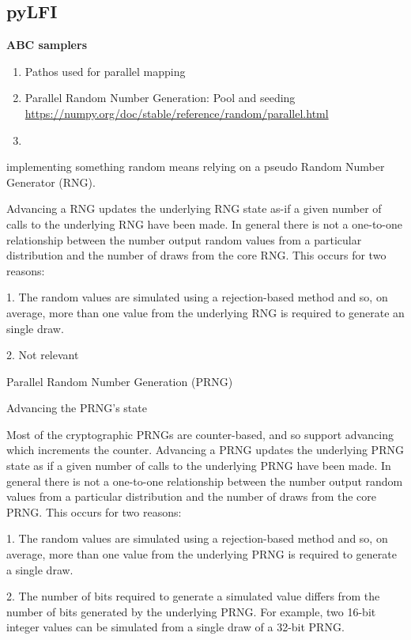 \subsection{pyLFI}

\textbf{ABC samplers} 

\begin{enumerate}
    \item Pathos used for parallel mapping
    \item Parallel Random Number Generation: Pool and seeding \url{https://numpy.org/doc/stable/reference/random/parallel.html} 
    \item 
\end{enumerate}

implementing something random means relying on a pseudo Random Number Generator (RNG).

Advancing a RNG updates the underlying RNG state as-if a given number of calls to the underlying RNG have been made. In general there is not a one-to-one relationship between the number output random values from a particular distribution and the number of draws from the core RNG. This occurs for two reasons:

1. The random values are simulated using a rejection-based method and so, on average, more than one value from the underlying RNG is required to generate an single draw.

2. Not relevant

Parallel Random Number Generation (PRNG) 

Advancing the PRNG’s state

Most of the cryptographic PRNGs are counter-based, and so support advancing which increments the counter. Advancing a PRNG updates the underlying PRNG state as if a given number of calls to the underlying PRNG have been made. In general there is not a one-to-one relationship between the number output random values from a particular distribution and the number of draws from the core PRNG. This occurs for two reasons:

1. The random values are simulated using a rejection-based method and so, on average, more than one value from the underlying PRNG is required to generate a single draw.

2. The number of bits required to generate a simulated value differs from the number of bits generated by the underlying PRNG. For example, two 16-bit integer values can be simulated from a single draw of a 32-bit PRNG.

